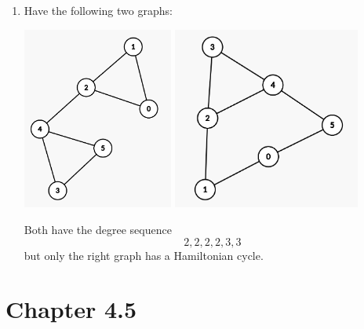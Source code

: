 \documentclass[12pt]{article}
\begin{document}
\begin{enumerate}
\begin{enumerate}
                  \item Have the following two graphs:
                        \begin{center}
                              \hfill
                              \includegraphics[height=6cm]{img/hw2/has_cycle}
                              \hfill
                              \includegraphics[height=6cm]{img/hw2/has_no_cycle}
                              \hfill \mbox{}
                        \end{center}
                        Both have the degree sequence
                        \[2, 2, 2, 2, 3, 3\]
                        but only the right graph has a Hamiltonian cycle.
            \end{enumerate}
\end{enumerate}

\pagebreak

\section{Chapter 4.5}
\end{document}
